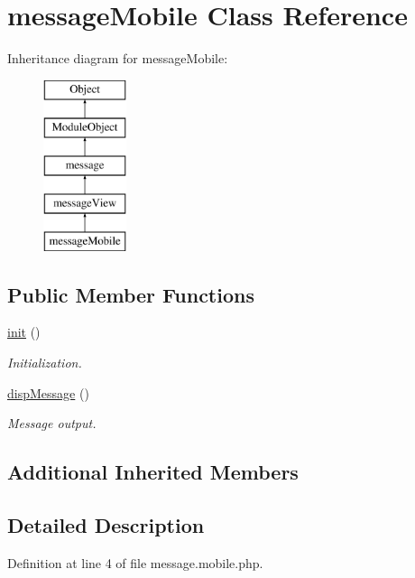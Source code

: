 \hypertarget{classmessageMobile}{}\section{message\+Mobile Class Reference}
\label{classmessageMobile}
Inheritance diagram for message\+Mobile\+:\begin{figure}[H]
\begin{center}
\leavevmode
\includegraphics[height=5.000000cm]{classmessageMobile}
\end{center}
\end{figure}
\subsection*{Public Member Functions}
\begin{DoxyCompactItemize}
\item 
\hyperlink{classmessageMobile_adbf0b398e93a9a202811c9149d51838c}{init} ()
\begin{DoxyCompactList}\small\item\em Initialization. \end{DoxyCompactList}\item 
\hyperlink{classmessageMobile_af0b28b049852fcf98444faceed1977fa}{disp\+Message} ()
\begin{DoxyCompactList}\small\item\em Message output. \end{DoxyCompactList}\end{DoxyCompactItemize}
\subsection*{Additional Inherited Members}


\subsection{Detailed Description}


Definition at line 4 of file message.\+mobile.\+php.



